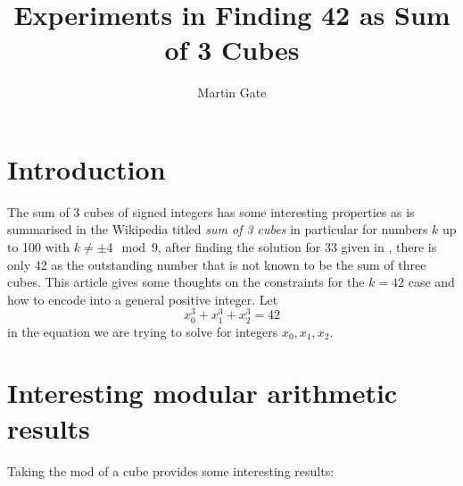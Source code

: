 \documentclass[a4paper,oneside,english]{article}
\numberwithin{equation}{section}
\numberwithin{figure}{section}
\numberwithin{table}{section}
\begin{document}
	\title{Experiments in Finding 42 as Sum of 3 Cubes }
	\author{Martin Gate}
	\maketitle
\section{Introduction}
The sum of 3 cubes of signed integers has some interesting properties as is summarised in the Wikipedia titled \emph{sum of 3 cubes } in particular for numbers $k$ up to 100 with $k \neq \pm 4 \mod 9$, after finding the solution  for 33 given in  \cite{sum-3-cubes-33}, there is only 42 as the outstanding number that is not known to be the sum of three cubes. This article gives some thoughts on the constraints for the $k=42$ case and how to encode into a general positive integer. Let \begin{equation}\label{cubes-42}
x_0^3+x_1^3+x_2^3 =42
\end{equation}
in the equation we are trying to solve for integers $x_0,x_1,x_2$.

\section{Interesting modular arithmetic results}
Taking the mod of a cube provides some interesting results:
\end{document}
